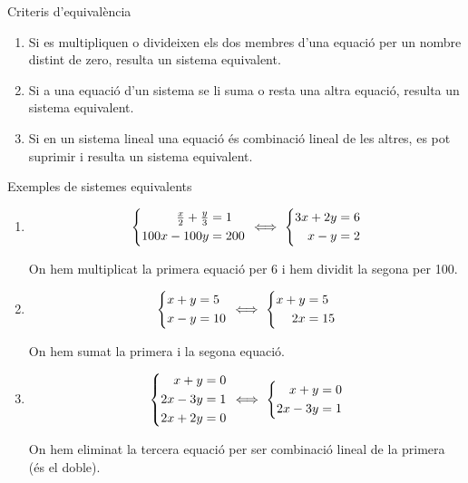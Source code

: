 \documentclass[11pt,a4paper]{article}
\newcommand{\fmdisp}[1]{\[\setbox2=\hbox{$\displaystyle #1$}\ifdim\wd2>\linewidth\resizebox{\linewidth}{!}{\box2}\else\box2\fi\]}
\begin{document}
\begin{fmprop}{Criteris d'equivalència}
\begin{enumerate}
\item Si es multipliquen o divideixen els dos membres d'una equació per un nombre distint de zero, resulta un sistema equivalent.
\item Si a una equació d'un sistema se li suma o resta una altra equació, resulta un sistema equivalent.
\item Si en un sistema lineal una equació és combinació lineal de les altres, es pot suprimir i resulta un sistema equivalent.
\end{enumerate}
\end{fmprop}

\begin{fmex}{Exemples de sistemes equivalents}
\begin{enumerate}[label=\textbf{\arabic*.},leftmargin=*]
\item
\fmdisp{\left\{\begin{aligned}\tfrac{x}{2}+\tfrac{y}{3}&=1\\ 100x-100y&=200\end{aligned}\right.\ \Longleftrightarrow\ \left\{\begin{aligned}3x+2y&=6\\ x-y&=2\end{aligned}\right.}

          On hem multiplicat la primera equació per 6 i hem dividit la segona per 100.
\item
\fmdisp{\left\{\begin{aligned}x+y&=5\\ x-y&=10\end{aligned}\right.\ \Longleftrightarrow\ \left\{\begin{aligned}x+y&=5\\ 2x&=15\end{aligned}\right.}

          On hem sumat la primera i la segona equació.
\item
\fmdisp{\left\{\begin{aligned}x+y&=0\\ 2x-3y&=1\\ 2x+2y&=0\end{aligned}\right.\ \Longleftrightarrow\ \left\{\begin{aligned}x+y&=0\\ 2x-3y&=1\end{aligned}\right.}

          On hem eliminat la tercera equació per ser combinació lineal de la primera (és el doble).
\end{enumerate}
\end{fmex}
\end{document}
